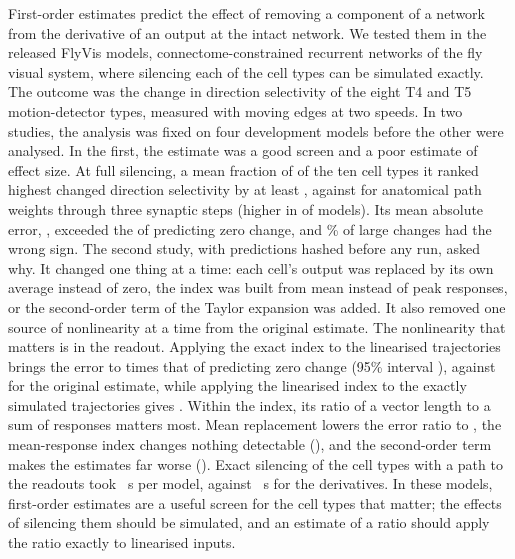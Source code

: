 First-order estimates predict the effect of removing a component of a network from the derivative of an output at the intact network. We tested them in the \NModels{} released FlyVis models, connectome-constrained recurrent networks of the fly visual system, where silencing each of the \NetTypes{} cell types can be simulated exactly. The outcome was the change in direction selectivity of the eight T4 and T5 motion-detector types, measured with moving edges at two speeds. In two studies, the analysis was fixed on four development models before the other \NConfModels{} were analysed. In the first, the estimate was a good screen and a poor estimate of effect size. At full silencing, a mean fraction of \PrecFOFull{} of the ten cell types it ranked highest changed direction selectivity by at least \LargeThreshold{}, against \PrecAnatFull{} for anatomical path weights through three synaptic steps (higher in \PrecWinsAnatFull{} of \NConfModels{} models). Its mean absolute error, \MaeFOFull{}, exceeded the \MaeZeroFull{} of predicting zero change, and \WrongSignFull\% of large changes had the wrong sign. The second study, with \PredPrimaryTotal{} predictions hashed before any run, asked why. It changed one thing at a time: each cell's output was replaced by its own average instead of zero, the index was built from mean instead of peak responses, or the second-order term of the Taylor expansion was added. It also removed one source of nonlinearity at a time from the original estimate. The nonlinearity that matters is in the readout. Applying the exact index to the linearised trajectories brings the error to \RatioCfReadFull{} times that of predicting zero change (95\% interval \RatioCICfReadFull{}), against \RatioRefFull{} for the original estimate, while applying the linearised index to the exactly simulated trajectories gives \RatioCfNetFull{}. Within the index, its ratio of a vector length to a sum of responses matters most. Mean replacement lowers the error ratio to \RatioAFull{}, the mean-response index changes nothing detectable (\RatioBFull{}), and the second-order term makes the estimates far worse (\RatioCFull{}). Exact silencing of the \SimulatedTypes{} cell types with a path to the readouts took \TimeExactFull{}~s per model, against \TimeGradient{}~s for the derivatives. In these models, first-order estimates are a useful screen for the cell types that matter; the effects of silencing them should be simulated, and an estimate of a ratio should apply the ratio exactly to linearised inputs.
